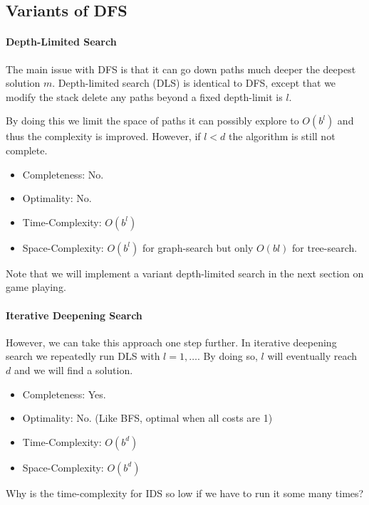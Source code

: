 \documentclass[11pt]{article}
\begin{document}
\subsection{Variants of DFS}

\paragraph{Depth-Limited Search}

The main issue with DFS is that it can go down paths much deeper the deepest solution $m$. 
Depth-limited search (DLS) is identical to DFS, except that we modify
the stack delete any paths beyond a fixed depth-limit is $l$.  


By
doing this we limit the space of paths it can possibly explore to
$O(b^l)$ and thus the complexity is improved. However, if $l < d$ the
algorithm is still not complete.

\begin{itemize}
\item Completeness: No.  
\item Optimality: No.
\item Time-Complexity: $O(b^l)$ 
\item Space-Complexity: $O(b^l)$ for graph-search but only $O(bl)$ for tree-search.
\end{itemize}


\noindent Note that we will implement a variant depth-limited search in the next section on game playing.

\paragraph{Iterative Deepening Search}

However, we can take this approach one step further. In iterative deepening search we repeatedly run DLS with $l = 1, \ldots$. By doing so, $l$ will eventually reach $d$ and we will find a solution. 

\begin{itemize}
\item Completeness: Yes.
\item Optimality: No. (Like BFS, optimal when all costs are 1)
\item Time-Complexity: $O(b^d)$ 
\item Space-Complexity: $O(b^d)$ 
\end{itemize}

\begin{exercise}
  Why is the time-complexity for IDS so low if we have to run it some many times?
\end{exercise}
\end{document}
